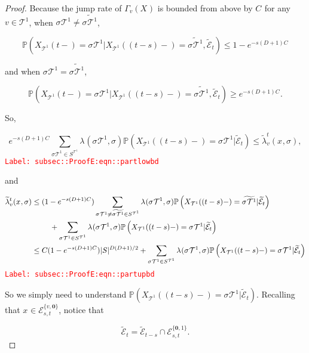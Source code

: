 \documentclass[12pt]{article}
\newcommand{\mb}{\mathbb}
\newcommand{\mc}{\mathcal}
\newcommand{\tr}{\textcolor{red}}
\newcommand{\labe}[1]{\tr{\texttt{Label: #1}}}
\newcommand{\pr}{\mb{P}}							%
\renewcommand{\root}{\mathbf{0}}				%
\renewcommand{\v}{v}							%
\renewcommand{\S}{S}							%
\newcommand{\s}{\sigma}							%
\newcommand{\sv}[1]{\s^{#1}}					%
\renewcommand{\t}{t}							%
\newcommand{\degr}{D}								%
\newcommand{\pup}[1]{^{#1}}							%
\newcommand{\tree}{\mc{T}}							%
\renewcommand{\tt}{s}								%
\newcommand{\XState}[1]{\S^{#1}}				%
\newcommand{\rxvt}[2]{X_{#1}{(#2)}}					%
\newcommand{\xvts}[2]{x_{#1}{#2}}					%
\newcommand{\rxvts}[2]{X_{#1}{#2}}					%
\newcommand{\rate}[1]{\lambda_{#1}}					%
\newcommand{\crate}[2]{\alt{\lambda}_{#1}^{#2}}		%
\newcommand{\const}[1]{C_{#1}}						%
\newcommand{\alt}{\widetilde}						%
\newcommand{\evnt}{\mc{E}}						%
\newcommand{\pmap}[1]{\Gamma_{#1}}				%
\begin{document}
\begin{proof}
Because the jump rate of \(\pmap{\v}(\rxvts{}{})\) is bounded from above by \(\const{}\) for any \(\v\in\tree\pup{1}\),  when \(\sv{}{\tree\pup{1}}\neq\alt{\sv{}{\tree\pup{1}}}\), 

\[\pr\left(\rxvt{\tree\pup{1}}{\t-} = \sv{}{\tree\pup{1}}|\rxvt{\tree\pup{1}}{(\t-\tt)-}=\alt{\sv{}{\tree\pup{1}}},\alt{\evnt}_\t\right) \leq 1-e^{-\tt(\degr+1)\const{}}\]

and when \(\sv{}{\tree\pup{1}}=\alt{\sv{}{\tree\pup{1}}}\),

\[\pr\left(\rxvt{\tree\pup{1}}{\t-} = \sv{}{\tree\pup{1}}|\rxvt{\tree\pup{1}}{(\t-\tt)-}=\alt{\sv{}{\tree\pup{1}}},\alt{\evnt}_\t\right) \geq e^{-\tt(\degr+1)\const{}}.\]

So,

\begin{equation}
e^{-\tt(\degr+1)\const{}}\sum_{\sv{}{\tree\pup{1}}\in \S^{\tree\pup{1}}} \rate{}(\sv{}{\tree\pup{1}},\s)\pr\left(\rxvt{\tree\pup{1}}{(\t-\tt)-}=\sv{}{\tree\pup{1}}|\alt{\evnt}_\t\right) \leq \crate{\v}{\t}(\xvts{}{},\s),
\label{subsec::ProofE:eqn::partlowbd}
\end{equation}
\labe{subsec::ProofE:eqn::partlowbd}

and

\begin{align}
\crate{\v}{\t}(\xvts{}{},\s)&\leq (1 - e^{-\tt(\degr+1)\const{}})\sum_{\sv{}{\tree\pup{1}}\neq \alt{\sv{}{\tree\pup{1}}} \in \S^{\tree\pup{1}}} \rate{}(\sv{}{\tree\pup{1}},\s)\pr\left(\rxvt{\tree\pup{1}}{(\t-\tt)-}=\alt{\sv{}{\tree\pup{1}}}|\alt{\evnt}_\t\right)\nonumber\\
&\hspace{24 pt} +\sum_{\sv{}{\tree\pup{1}} \in \S^{\tree\pup{1}}} \rate{}(\sv{}{\tree\pup{1}},\s)\pr\left(\rxvt{\tree\pup{1}}{(\t-\tt)-}=\sv{}{\tree\pup{1}}|\alt{\evnt}_\t\right)\nonumber\\
&\leq \const{}(1 - e^{-\tt(\degr+1)\const{}})|\S|^{\degr(\degr+1)/2} + \sum_{\sv{}{\tree\pup{1}} \in \S^{\tree\pup{1}}} \rate{}(\sv{}{\tree\pup{1}},\s)\pr\left(\rxvt{\tree\pup{1}}{(\t-\tt)-}=\sv{}{\tree\pup{1}}|\alt{\evnt}_\t\right)
\label{subsec::ProofE:eqn::partupbd}
\end{align}
\labe{subsec::ProofE:eqn::partupbd}

So we simply need to understand \(\pr\left(\rxvt{\tree\pup{1}}{(\t-\tt)-}=\sv{}{\tree\pup{1}}|\alt{\evnt}_\t\right)\). Recalling that \(\xvts{}{} \in \evnt^{\{\v,\root\}}_{\tt,\t}\), notice that

\[\alt{\evnt}_\t = \alt{\evnt}_{\t-\tt}\cap \evnt^{\{\root,1\}}_{\tt,\t}.\]


\end{proof}
\end{document}
